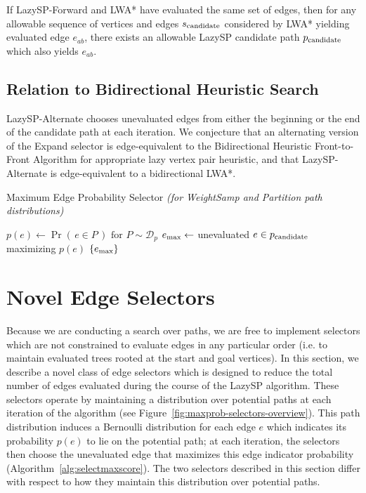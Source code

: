 \begin{theorem}
If LazySP-Forward and LWA* have evaluated the same set of edges,
then for any allowable sequence of vertices and edges $s_{\mbox{\scriptsize candidate}}$
considered by LWA* yielding evaluated edge $e_{ab}$,
there exists an allowable LazySP candidate path $p_{\mbox{\scriptsize candidate}}$
which also yields $e_{ab}$.
\label{thm:lwastar-equiv-to-lazy}
\end{theorem}

\subsection{Relation to Bidirectional Heuristic Search}

LazySP-Alternate chooses unevaluated edges from either
the beginning or the end of the candidate path at each iteration.
We conjecture that an alternating version of the Expand selector
is edge-equivalent to the
Bidirectional Heuristic Front-to-Front Algorithm
\citep{sint1977bhffa}
for appropriate lazy vertex pair heuristic,
and that LazySP-Alternate is edge-equivalent
to a bidirectional LWA*.

\begin{algorithm}[t]
   \caption{Maximum Edge Probability Selector
      \emph{(for WeightSamp and Partition path distributions)}}
   \begin{algorithmic}[1]
   \State $p(e) \leftarrow \Pr( \, e \in P \, )
      \mbox{ for } P \sim \mathcal{D}_p$
   \State $e_{\mbox{\scriptsize max}} \leftarrow$ unevaluated $e \in p_{\mbox{\scriptsize candidate}}$
      maximizing $p(e)$
   \State \Return $\{ e_{\mbox{\scriptsize max}} \}$
   \EndFunction
   \end{algorithmic}
   \label{alg:selectmaxscore}
\end{algorithm}

\section{Novel Edge Selectors}

Because we are conducting a search over paths,
we are free to implement selectors which are not constrained to
evaluate edges in any particular order
(i.e. to maintain evaluated trees rooted at the start and goal
vertices).
In this section,
we describe a novel class of edge selectors which is designed
to reduce the total number of edges evaluated during the course
of the LazySP algorithm.
These selectors operate by maintaining a distribution over potential
paths at each iteration of the algorithm
(see Figure~\ref{fig:maxprob-selectors-overview}).
This path distribution induces a Bernoulli distribution for each
edge $e$ which indicates its probability $p(e)$ to lie on
the potential path;
at each iteration,
the selectors then choose the unevaluated edge that maximizes
this edge indicator probability (Algorithm~\ref{alg:selectmaxscore}).
The two selectors described in this section differ
with respect to how they maintain this distribution over potential paths.

